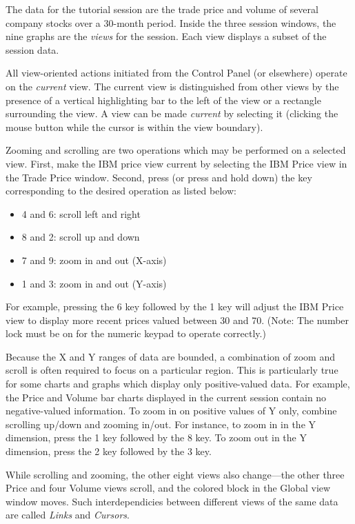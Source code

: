 The data for the tutorial session are the trade price and volume of several
company stocks over a 30-month period. Inside the three session windows, the
nine graphs are the {\em views} for the session. Each view displays a subset of
the session data.

All view-oriented actions initiated from the Control Panel (or elsewhere)
operate on the {\em current} view. The current view is distinguished from other
views by the presence of a vertical highlighting bar to the left of the view or
a rectangle surrounding the view. A view can be made {\em current} by selecting
it (clicking the mouse button while the cursor is within the view boundary).

Zooming and scrolling are two operations which may be performed on a selected
view. First, make the IBM price view current by selecting the IBM Price view in
the Trade Price window. Second, press (or press and hold down) the key
corresponding to the desired operation as listed below:

\begin{itemize}
	\item 4 and 6: scroll left and right
	\item 8 and 2: scroll up and down
	\item 7 and 9: zoom in and out (X-axis)
	\item 1 and 3: zoom in and out (Y-axis)
\end{itemize}

For example, pressing the 6 key followed by the 1 key will adjust the IBM Price
view to display more recent prices valued between 30 and 70. (Note: The number
lock must be on for the numeric keypad to operate correctly.)

Because the X and Y ranges of data are bounded, a combination of zoom and scroll
is often required to focus on a particular region. This is particularly true for
some charts and graphs which display only positive-valued data. For example, the
Price and Volume bar charts displayed in the current session contain no
negative-valued information. To zoom in on positive values of Y only, combine
scrolling up/down and zooming in/out. For instance, to zoom in in the Y
dimension, press the 1 key followed by the 8 key.  To zoom out in the Y
dimension, press the 2 key followed by the 3 key.

While scrolling and zooming, the other eight views also change---the other three
Price and four Volume views scroll, and the colored block in the Global view
window moves. Such interdependicies between different views of the same data are
called {\em Links} and {\em Cursors}.


